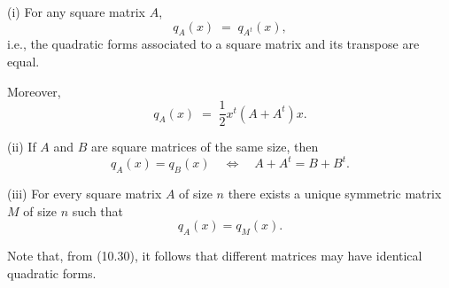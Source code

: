 
\begin{theorem}
(i) For any square matrix $A$,
\[
q_A(x) \;=\; q_{A^t}(x),
\]
i.e., the quadratic forms associated to a square matrix and its transpose are equal.

Moreover,
\begin{equation}
q_A(x) \;=\; \frac12 x^t\left(A+A^t\right)x.
\end{equation}

(ii) If $A$ and $B$ are square matrices of the same size, then
\begin{equation}
q_A(x) = q_B(x) \quad \iff \quad A+A^t = B+B^t.
\end{equation}

(iii) For every square matrix $A$ of size $n$ there exists a unique symmetric matrix
$M$ of size $n$ such that
\[
q_A(x) = q_M(x).
\]
\end{theorem}

Note that, from (10.30), it follows that different matrices may have identical
quadratic forms.

